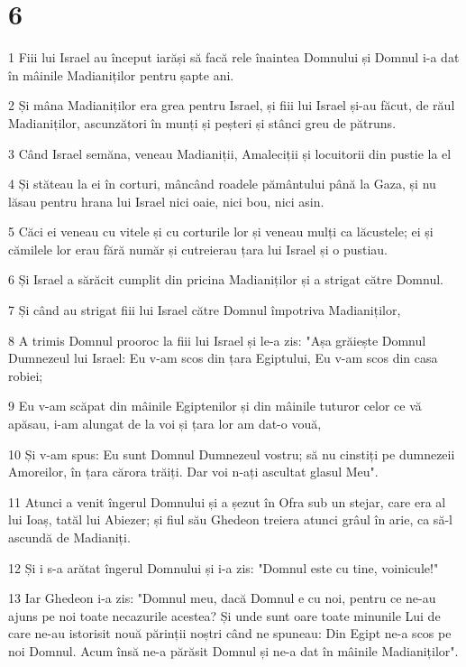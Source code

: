 \chapter{6}

\par 1 Fiii lui Israel au început iarăși să facă rele înaintea Domnului și Domnul i-a dat în mâinile Madianiților pentru șapte ani.
\par 2 Și mâna Madianiților era grea pentru Israel, și fiii lui Israel și-au făcut, de răul Madianiților, ascunzători în munți și peșteri și stânci greu de pătruns.
\par 3 Când Israel semăna, veneau Madianiții, Amaleciții și locuitorii din pustie la el
\par 4 Și stăteau la ei în corturi, mâncând roadele pământului până la Gaza, și nu lăsau pentru hrana lui Israel nici oaie, nici bou, nici asin.
\par 5 Căci ei veneau cu vitele și cu corturile lor și veneau mulți ca lăcustele; ei și cămilele lor erau fără număr și cutreierau țara lui Israel și o pustiau.
\par 6 Și Israel a sărăcit cumplit din pricina Madianiților și a strigat către Domnul.
\par 7 Și când au strigat fiii lui Israel către Domnul împotriva Madianiților,
\par 8 A trimis Domnul prooroc la fiii lui Israel și le-a zis: "Așa grăiește Domnul Dumnezeul lui Israel: Eu v-am scos din țara Egiptului, Eu v-am scos din casa robiei;
\par 9 Eu v-am scăpat din mâinile Egiptenilor și din mâinile tuturor celor ce vă apăsau, i-am alungat de la voi și țara lor am dat-o vouă,
\par 10 Și v-am spus: Eu sunt Domnul Dumnezeul vostru; să nu cinstiți pe dumnezeii Amoreilor, în țara cărora trăiți. Dar voi n-ați ascultat glasul Meu".
\par 11 Atunci a venit îngerul Domnului și a șezut în Ofra sub un stejar, care era al lui Ioaș, tatăl lui Abiezer; și fiul său Ghedeon treiera atunci grâul în arie, ca să-l ascundă de Madianiți.
\par 12 Și i s-a arătat îngerul Domnului și i-a zis: "Domnul este cu tine, voinicule!"
\par 13 Iar Ghedeon i-a zis: "Domnul meu, dacă Domnul e cu noi, pentru ce ne-au ajuns pe noi toate necazurile acestea? Și unde sunt oare toate minunile Lui de care ne-au istorisit nouă părinții noștri când ne spuneau: Din Egipt ne-a scos pe noi Domnul. Acum însă ne-a părăsit Domnul și ne-a dat în mâinile Madianiților".

